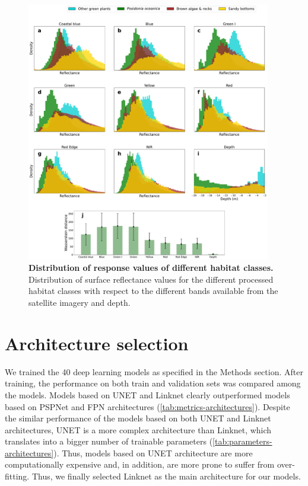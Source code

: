 \begin{figure}[H]
    \centering

    \includegraphics[width=0.95\textwidth]{Figures/Reflectance_histograms_Mallorca_only.pdf}
    \caption[Distribution of response values of different habitat
        classes]{\textbf{Distribution of response values of different habitat
            classes.} Distribution of surface reflectance values for the
        different processed habitat classes with respect to the different bands
        available from the satellite imagery and depth.}
    \label{fig:reflectance}
\end{figure}

\section{Architecture selection}\label{app:architecture_selection}

We trained the 40 deep learning models as specified in the Methods
section. After training, the performance on both train and validation sets was
compared among the models. Models based on UNET and Linknet clearly
outperformed models based on PSPNet and FPN architectures
(\cref{tab:metrics-architectures}). Despite the similar performance of the
models based on both UNET and Linknet architectures, UNET is a more complex
architecture than Linknet, which translates into a bigger number of trainable
parameters (\cref{tab:parameters-architectures}). Thus, models based on UNET
architecture are more computationally expensive and, in addition, are more
prone to suffer from over-fitting. Thus, we finally selected Linknet as the
main architecture for our models.

